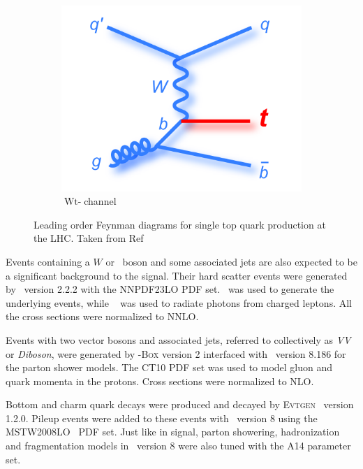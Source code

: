 \begin{figure}[h]
\begin{subfigure}{0.33\textwidth}
					 \includegraphics[width=\textwidth]{figures/feynman_tqb_bb_bold_midblue.png}
\caption{$\operatorname{Wt-}$channel}
\end{subfigure}%
\caption{Leading order Feynman diagrams for single top quark production at the LHC. Taken 
from Ref~\cite{D0:ttBarFeyn}} 
\label{fig:singleTopDg}
\end{figure} %

\par Events containing a $W$ or \Zboson\ boson and some associated jets are 
also expected to be a significant background to the signal. Their hard scatter events were generated by 
\MGMCatNLO\ version 2.2.2 with the NNPDF23LO PDF set. \ was used to generate 
the underlying events, while \PHOTOS~\cite{Davidson:2010ew} was used to radiate photons from charged leptons. 
All the cross sections were normalized to NNLO. 

\par Events with two vector bosons and associated
jets, referred to collectively as {\it VV} or {\it Diboson}, were generated by \POWHEG-\textsc{Box} version 2 interfaced 
with \PYTHIA\ version 8.186 for the parton shower models. The CT10 PDF set was used to model 
gluon and quark momenta in the protons. Cross sections were normalized to NLO. 

\par Bottom and charm quark decays were produced and decayed by \textsc{Evtgen}~\cite{Lange2001152}
 version 1.2.0. Pileup events were added to these 
events with \PYTHIA\ version 8 using the MSTW2008LO~\cite{Martin:2009iq, Martin:2009bu, Martin:2010db}
 PDF set. Just like in signal, parton showering, hadronization and fragmentation models in \PYTHIA\ version 8 were 
also tuned with the A14 parameter set.  
